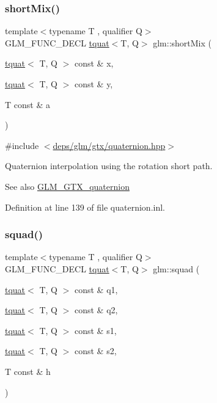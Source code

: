 \subsubsection{\texorpdfstring{short\+Mix()}{shortMix()}}
{\footnotesize\ttfamily template$<$typename T , qualifier Q$>$ \\
G\+L\+M\+\_\+\+F\+U\+N\+C\+\_\+\+D\+E\+CL \hyperlink{structglm_1_1tquat}{tquat}$<$T, Q$>$ glm\+::short\+Mix (\begin{DoxyParamCaption}\item[{\hyperlink{structglm_1_1tquat}{tquat}$<$ T, Q $>$ const \&}]{x,  }\item[{\hyperlink{structglm_1_1tquat}{tquat}$<$ T, Q $>$ const \&}]{y,  }\item[{T const \&}]{a }\end{DoxyParamCaption})}



{\ttfamily \#include $<$\hyperlink{gtx_2quaternion_8hpp}{deps/glm/gtx/quaternion.\+hpp}$>$}

Quaternion interpolation using the rotation short path.

\begin{DoxySeeAlso}{See also}
\hyperlink{group__gtx__quaternion}{G\+L\+M\+\_\+\+G\+T\+X\+\_\+quaternion} 
\end{DoxySeeAlso}


Definition at line 139 of file quaternion.\+inl.

\mbox{\label{group__gtx__quaternion_gacfcb16619e166e672c4672aff50a565c}} 
\subsubsection{\texorpdfstring{squad()}{squad()}}
{\footnotesize\ttfamily template$<$typename T , qualifier Q$>$ \\
G\+L\+M\+\_\+\+F\+U\+N\+C\+\_\+\+D\+E\+CL \hyperlink{structglm_1_1tquat}{tquat}$<$T, Q$>$ glm\+::squad (\begin{DoxyParamCaption}\item[{\hyperlink{structglm_1_1tquat}{tquat}$<$ T, Q $>$ const \&}]{q1,  }\item[{\hyperlink{structglm_1_1tquat}{tquat}$<$ T, Q $>$ const \&}]{q2,  }\item[{\hyperlink{structglm_1_1tquat}{tquat}$<$ T, Q $>$ const \&}]{s1,  }\item[{\hyperlink{structglm_1_1tquat}{tquat}$<$ T, Q $>$ const \&}]{s2,  }\item[{T const \&}]{h }\end{DoxyParamCaption})}



